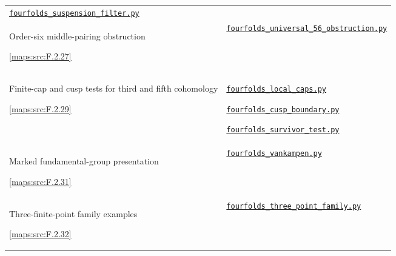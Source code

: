 \begin{longtable}{@{}p{}p{}@{}}
\href{https://github.com/KokunoYumeto/s6-complex-structure-workbench/blob/\SsixRepositoryCommit/pro_returns/S6_10_PAPERS_checkpoint_15_20261119T1045Z/S6_10_PAPERS/code/V/replay_chains/code/fourfolds_suspension_filter.py}{\nolinkurl{fourfolds_suspension_filter.py}} \\[3pt]
\hypertarget{prog:V:middle-pairing}{}Order-six middle-pairing obstruction\par \cref{maps:src:F.2.27} &
\href{https://github.com/KokunoYumeto/s6-complex-structure-workbench/blob/\SsixRepositoryCommit/pro_returns/S6_10_PAPERS_checkpoint_15_20261119T1045Z/S6_10_PAPERS/code/V/replay_chains/code/fourfolds_universal_56_obstruction.py}{\nolinkurl{fourfolds_universal_56_obstruction.py}} \\[3pt]
\hypertarget{prog:V:cap-tests}{}Finite-cap and cusp tests for third and fifth cohomology\par \cref{maps:src:F.2.29} &
\href{https://github.com/KokunoYumeto/s6-complex-structure-workbench/blob/\SsixRepositoryCommit/pro_returns/S6_10_PAPERS_checkpoint_15_20261119T1045Z/S6_10_PAPERS/code/V/replay_chains/code/fourfolds_local_caps.py}{\nolinkurl{fourfolds_local_caps.py}}\par \href{https://github.com/KokunoYumeto/s6-complex-structure-workbench/blob/\SsixRepositoryCommit/pro_returns/S6_10_PAPERS_checkpoint_15_20261119T1045Z/S6_10_PAPERS/code/V/replay_chains/code/fourfolds_cusp_boundary.py}{\nolinkurl{fourfolds_cusp_boundary.py}}\par \href{https://github.com/KokunoYumeto/s6-complex-structure-workbench/blob/\SsixRepositoryCommit/pro_returns/S6_10_PAPERS_checkpoint_15_20261119T1045Z/S6_10_PAPERS/code/V/replay_chains/code/fourfolds_survivor_test.py}{\nolinkurl{fourfolds_survivor_test.py}} \\[3pt]
\hypertarget{prog:V:fundamental-group}{}Marked fundamental-group presentation\par \cref{maps:src:F.2.31} &
\href{https://github.com/KokunoYumeto/s6-complex-structure-workbench/blob/\SsixRepositoryCommit/pro_returns/S6_10_PAPERS_checkpoint_15_20261119T1045Z/S6_10_PAPERS/code/V/replay_chains/code/fourfolds_vankampen.py}{\nolinkurl{fourfolds_vankampen.py}} \\[3pt]
\hypertarget{prog:V:three-points}{}Three-finite-point family examples\par \cref{maps:src:F.2.32} &
\href{https://github.com/KokunoYumeto/s6-complex-structure-workbench/blob/\SsixRepositoryCommit/pro_returns/S6_10_PAPERS_checkpoint_15_20261119T1045Z/S6_10_PAPERS/code/V/replay_chains/code/fourfolds_three_point_family.py}{\nolinkurl{fourfolds_three_point_family.py}} \\[3pt]

\end{longtable}
